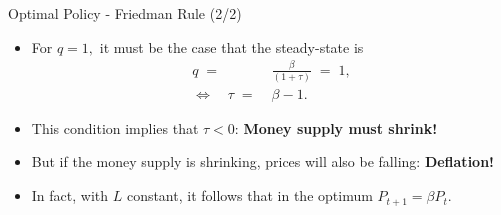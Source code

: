 \documentclass[10pt,c,aspectratio=1610,handout]{beamer}
\begin{document}
\begin{frame}{Optimal Policy - Friedman Rule (2/2)}%
  \begin{itemize}%
    \item[$\blacktriangleright$] For $q=1,$ it must be the case that the steady-state is%
    \begin{align*}%
      q \; = & \; \frac{\beta}{(1+\tau)} \; = \; 1,\\%
      \Leftrightarrow \quad \tau \; = & \; \beta - 1.%
    \end{align*}%
    \vspace*{-0.1in}%
    \pause%
    \item[$\blacktriangleright$] This condition implies that $\tau <0$: \textbf{Money supply must shrink!}%
    \item[$\blacktriangleright$] But if the money supply is shrinking, prices will also be falling: \textbf{Deflation!}%
    \item[$\blacktriangleright$] In fact, with $L$ constant, it follows that in the optimum $P_{t+1} = \beta P_{t}$.%
    \begin{itemize}%
    \end{itemize}%
  \end{itemize}%
\end{frame}%
\end{document}

